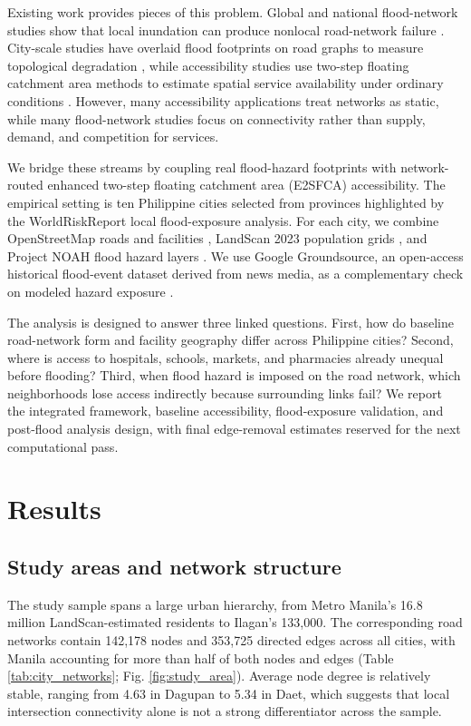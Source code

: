 \documentclass[9pt,twocolumn,twoside]{pnas-new}
\begin{document}
Existing work provides pieces of this problem. Global and national flood-network studies show that local inundation can produce nonlocal road-network failure \cite{wang2019,boeingha2024}. City-scale studies have overlaid flood footprints on road graphs to measure topological degradation \cite{casali2019}, while accessibility studies use two-step floating catchment area methods to estimate spatial service availability under ordinary conditions \cite{luo2009,chen2019}. However, many accessibility applications treat networks as static, while many flood-network studies focus on connectivity rather than supply, demand, and competition for services.

We bridge these streams by coupling real flood-hazard footprints with network-routed enhanced two-step floating catchment area (E2SFCA) accessibility. The empirical setting is ten Philippine cities selected from provinces highlighted by the WorldRiskReport local flood-exposure analysis. For each city, we combine OpenStreetMap roads and facilities \cite{boeing2017,openstreetmap}, LandScan 2023 population grids \cite{landscan2023}, and Project NOAH flood hazard layers \cite{lagmay2017,projectnoah}. We use Google Groundsource, an open-access historical flood-event dataset derived from news media, as a complementary check on modeled hazard exposure \cite{google2026}.

The analysis is designed to answer three linked questions. First, how do baseline road-network form and facility geography differ across Philippine cities? Second, where is access to hospitals, schools, markets, and pharmacies already unequal before flooding? Third, when flood hazard is imposed on the road network, which neighborhoods lose access indirectly because surrounding links fail? We report the integrated framework, baseline accessibility, flood-exposure validation, and post-flood analysis design, with final edge-removal estimates reserved for the next computational pass.\par\normalcolwidth

\section*{Results}

\subsection*{Study areas and network structure}
The study sample spans a large urban hierarchy, from Metro Manila's 16.8 million LandScan-estimated residents to Ilagan's 133,000. The corresponding road networks contain 142,178 nodes and 353,725 directed edges across all cities, with Manila accounting for more than half of both nodes and edges (Table \ref{tab:city_networks}; Fig. \ref{fig:study_area}). Average node degree is relatively stable, ranging from 4.63 in Dagupan to 5.34 in Daet, which suggests that local intersection connectivity alone is not a strong differentiator across the sample.
\end{document}
